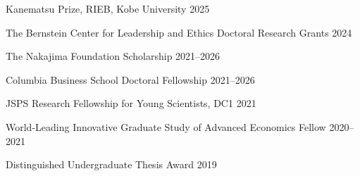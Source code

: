 
\begin{cventries}

\cventrysimple
    {Kanematsu Prize, RIEB, Kobe University}  %
    {2025} %
    {}
	
\cventrysimple
    {The Bernstein Center for Leadership and Ethics Doctoral Research Grants}  %
    {2024} %
    {}
	
\cventrysimple
    {The Nakajima Foundation Scholarship}  %
    {2021--2026} %
    {}
	
\cventrysimple
    {Columbia Business School Doctoral Fellowship}  %
    {2021--2026} %
    {}
	
\cventrysimple
	{JSPS Research Fellowship for Young Scientists, DC1}  %
    {2021} %
    {}

\cventrysimple
	{World-Leading Innovative Graduate Study of Advanced Economics Fellow}  %
    {2020--2021} %
    {}

\cventrysimple
    {Distinguished Undergraduate Thesis Award}  %
    {2019} %
    {}

\end{cventries}
